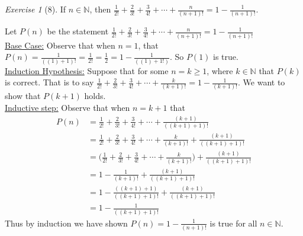 \documentclass[12pt]{amsart}
\makeatletter
\theoremstyle{remark}
\newtheorem*{exercise}{Exercise}%
\def\NN{\ensuremath{\mathbb N}}
\renewenvironment{proof}[1][\proofname]{\par\doublespacing
  \pushQED{\qed}%
  \normalfont \topsep6\p@\@plus6\p@\relax
  \list{}{%
    \settowidth{\leftmargin}{\itshape\proofname:\hskip\labelsep}%
    \setlength{\labelwidth}{0pt}%
    \setlength{\itemindent}{-\leftmargin}%
  }%
  \item[\hskip\labelsep\itshape#1\@addpunct{:}]\ignorespaces
}{%
  \popQED\endlist\@endpefalse
  \singlespacing
}
\theoremstyle{mycomment}
\makeatother
\begin{document}
\begin{exercise}[8] If $n\in\NN$, then $\frac{1}{2!}+\frac{2}{3!}+\frac{3}{4!}+\cdots+\frac{n}{(n+1)!}=1-\frac{1}{(n+1)!}$.
\begin{proof}%
  Let $P(n)$ be the statement $\frac{1}{2!}+\frac{2}{3!}+\frac{3}{4!}+\cdots+\frac{n}{(n+1)!}=1-\frac{1}{(n+1)!}$ \\
  \underline{Base Case:} Observe that when $n = 1$, that $P(n) = \frac{1}{((1)+1)!} = \frac{1}{2!} = \frac{1}{2} = 1 - \frac{1}{((1) + 1!)}$. So $P(1)$ is true. \\
  \underline{Induction Hypothesis:} Suppose that for some $n = k \geq 1$, where $k \in \NN$ that $P(k)$ is correct. That is to say $\frac{1}{2!} + \frac{2}{3!} + \frac{3}{4!} + \cdots + \frac{k}{(k+1)!} = 1 - \frac{1}{(k+1)!}$. We want to show that $P(k+1)$ holds.\\
  \underline{Inductive step:} Observe that when $n = k+1$ that \\
  \begin{align*}
    P(n) &= \frac{1}{2!} + \frac{2}{3!} + \frac{3}{4!} + \cdots + \frac{(k+1)}{((k+1)+1)!} \\
         &= \frac{1}{2!} + \frac{2}{3!} + \frac{3}{4!} + \cdots + \frac{k}{(k+1)!} + \frac{(k+1)}{((k+1)+1)!}  \\
         &= \biggl(\frac{1}{2!} + \frac{2}{3!} + \frac{3}{4!} + \cdots + \frac{k}{(k+1)!}\biggr) + \frac{(k+1)}{((k+1)+1)!}  \\
         &= 1 - \frac{1}{(k+1)!} + \frac{(k+1)}{((k+1)+1)!}  \\
         &= 1 - \frac{((k+1)+1)}{((k+1)+1)!} + \frac{(k+1)}{((k+1)+1)!} \\
         &= 1 - \frac{1}{((k+1)+1)!}
  \end{align*}
  Thus by induction we have shown $P(n) = 1 - \frac{1}{(n+1)!}$ is true for all $n \in \NN$.
\end{proof}
\end{exercise}
\end{document}
